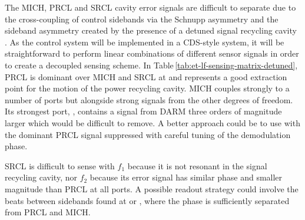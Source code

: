 The \gls{MICH}, \gls{PRCL} and \gls{SRCL} cavity error signals are difficult to separate due to the cross-coupling of control sidebands via the Schnupp asymmetry and the sideband asymmetry created by the presence of a detuned signal recycling cavity \cite{Hild2007}. As the control system will be implemented in a \LIGO{} \gls{CDS}-style system, it will be straightforward to perform linear combinations of different sensor signals in order to create a decoupled sensing scheme. In Table\,\ref{tab:et-lf-sensing-matrix-detuned}, \gls{PRCL} is dominant over \gls{MICH} and \gls{SRCL} at \POPFIRST{} and represents a good extraction point for the motion of the power recycling cavity. \gls{MICH} couples strongly to a number of ports but alongside strong signals from the other degrees of freedom. Its strongest port, \ASSECOND{}, contains a signal from \gls{DARM} three orders of magnitude larger which would be difficult to remove. A better approach could be to use \POPSECOND{} with the dominant \gls{PRCL} signal suppressed with careful tuning of the demodulation phase.

\gls{SRCL} is difficult to sense with $f_1$ because it is not resonant in the signal recycling cavity, nor $f_2$ because its error signal has similar phase and smaller magnitude than \gls{PRCL} at all ports. A possible readout strategy could involve the beats between sidebands found at \REFLDIFF{} or \REFLSUM{}, where the phase is sufficiently separated from \gls{PRCL} and \gls{MICH}.

% 

